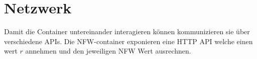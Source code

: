\section{Netzwerk}

Damit die Container untereinander interagieren können kommunizieren sie über
verschiedene APIs. Die NFW-container exponieren eine HTTP API welche einen wert \( r \)
annehmen und den jeweiligen NFW Wert ausrechnen.
